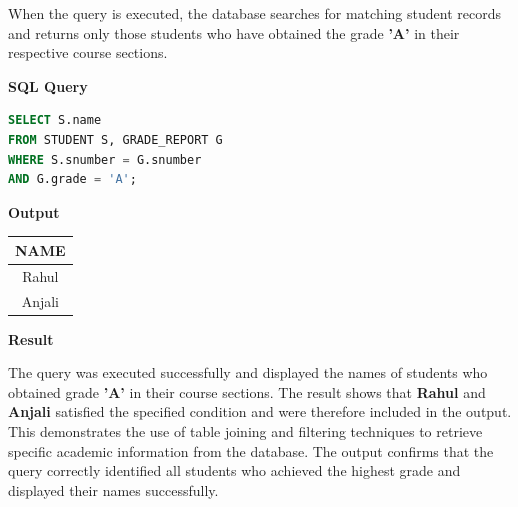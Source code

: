 \documentclass[12pt,a4paper]{report}
\begin{document}
When the query is executed, the database searches for matching student records and returns only those students who have obtained the grade \textbf{'A'} in their respective course sections.

\vspace{0.4cm}

\textbf{SQL Query}

\begin{lstlisting}[language=SQL]
SELECT S.name
FROM STUDENT S, GRADE_REPORT G
WHERE S.snumber = G.snumber
AND G.grade = 'A';
\end{lstlisting}

\vspace{0.5cm}

\textbf{Output}

\vspace{0.3cm}

\begin{center}
\renewcommand{\arraystretch}{1.6}
\begin{tabular}{|c|}
\hline
\textbf{NAME} \\
\hline
Rahul \\
\hline
Anjali \\
\hline
\end{tabular}
\end{center}

\vspace{0.7cm}

\textbf{Result}

The query was executed successfully and displayed the names of students who obtained grade \textbf{'A'} in their course sections. The result shows that \textbf{Rahul} and \textbf{Anjali} satisfied the specified condition and were therefore included in the output. This demonstrates the use of table joining and filtering techniques to retrieve specific academic information from the database. The output confirms that the query correctly identified all students who achieved the highest grade and displayed their names successfully.

\newpage

\end{document}
